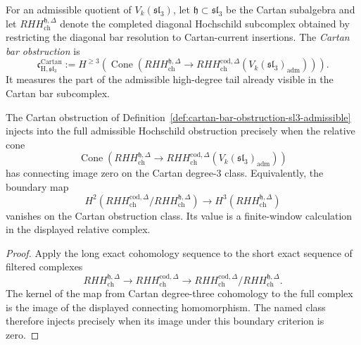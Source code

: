 \begin{definition}
\label{def:cartan-bar-obstruction-sl3-admissible}
For an admissible quotient of $V_k(\mathfrak{sl}_3)$, let
$\mathfrak h\subset\mathfrak{sl}_3$ be the Cartan subalgebra and let
$RHH_{\mathrm{ch}}^{\mathfrak h,\Delta}$ denote the completed
diagonal Hochschild subcomplex obtained by restricting the diagonal
bar resolution to Cartan-current insertions. The \emph{Cartan bar
obstruction} is
\[
\mathfrak c_{\mathrm H,\mathfrak{sl}_3}^{\mathrm{Cartan}}
:=
H^{\ge3}\!\left(
\operatorname{Cone}\!\left(
RHH_{\mathrm{ch}}^{\mathfrak h,\Delta}
\longrightarrow
RHH_{\mathrm{ch}}^{\mathrm{cod},\Delta}
(V_k(\mathfrak{sl}_3)_{\mathrm{adm}})
\right)
\right).
\]
It measures the part of the admissible high-degree tail already
visible in the Cartan bar subcomplex.
\end{definition}

\begin{proposition}
\label{prop:cartan-obstruction-injectivity-criterion}
The Cartan obstruction of
Definition~\ref{def:cartan-bar-obstruction-sl3-admissible} injects
into the full admissible Hochschild obstruction precisely when the
relative cone
\[
\operatorname{Cone}\!\left(
RHH_{\mathrm{ch}}^{\mathfrak h,\Delta}
\longrightarrow
RHH_{\mathrm{ch}}^{\mathrm{cod},\Delta}
(V_k(\mathfrak{sl}_3)_{\mathrm{adm}})
\right)
\]
has connecting image zero on the Cartan degree-$3$ class. Equivalently,
the boundary map
\[
H^2\!\left(
RHH_{\mathrm{ch}}^{\mathrm{cod},\Delta}/
RHH_{\mathrm{ch}}^{\mathfrak h,\Delta}
\right)
\longrightarrow
H^3\!\left(RHH_{\mathrm{ch}}^{\mathfrak h,\Delta}\right)
\]
vanishes on the Cartan obstruction class.  Its value is a
finite-window calculation in the displayed relative complex.
\end{proposition}

\begin{proof}
Apply the long exact cohomology sequence to the short exact sequence
of filtered complexes
\[
RHH_{\mathrm{ch}}^{\mathfrak h,\Delta}
\longrightarrow
RHH_{\mathrm{ch}}^{\mathrm{cod},\Delta}
\longrightarrow
RHH_{\mathrm{ch}}^{\mathrm{cod},\Delta}/
RHH_{\mathrm{ch}}^{\mathfrak h,\Delta}.
\]
The kernel of the map from Cartan degree-three cohomology to the full
complex is the image of the displayed connecting homomorphism.  The
named class therefore injects precisely when its image under this
boundary criterion is zero.
\end{proof}

